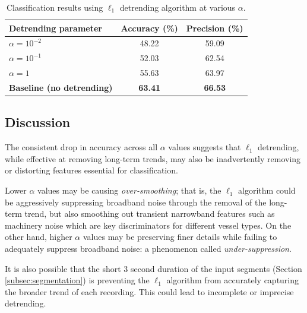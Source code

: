 \begin{table}[htbp]
    \centering
    \caption{Classification results using $\ell_1$ detrending algorithm at various $\alpha$.}
    \label{tab:detrend-results-3s}
    \begin{tabular}{lcc}
        \toprule
        \textbf{Detrending parameter} & \textbf{Accuracy (\%)} & \textbf{Precision (\%)} \\ \midrule
        $\alpha = 10^{-2}$            & 48.22 & 59.09 \\
        $\alpha = 10^{-1}$            & 52.03 & 62.54 \\
        $\alpha = 1$                  & 55.63 & 63.97 \\
        \textbf{Baseline (no detrending)}  & \textbf{63.41} & \textbf{66.53} \\
        \bottomrule
    \end{tabular}
\end{table}

\subsection{Discussion}

The consistent drop in accuracy across all $\alpha$ values suggests that $\ell_1$ detrending, while effective at removing long-term trends, may also be inadvertently removing or distorting features essential for classification.

Lower $\alpha$ values may be causing \textit{over-smoothing}; that is, the $\ell_1$ algorithm could be aggressively suppressing broadband noise through the removal of the long-term trend, but also smoothing out transient narrowband features such as machinery noise which are key discriminators for different vessel types. On the other hand, higher $\alpha$ values may be preserving finer details while failing to adequately suppress broadband noise: a phenomenon called \textit{under-suppression}. 

It is also possible that the short 3 second duration of the input segments (Section \ref{subsec:segmentation}) is preventing the $\ell_1$ algorithm from accurately capturing the broader trend of each recording. This could lead to incomplete or imprecise detrending.

